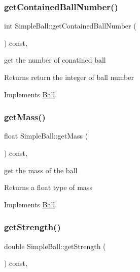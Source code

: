 \subsubsection{\texorpdfstring{get\+Contained\+Ball\+Number()}{getContainedBallNumber()}}
{\footnotesize\ttfamily int Simple\+Ball\+::get\+Contained\+Ball\+Number (\begin{DoxyParamCaption}{ }\end{DoxyParamCaption}) const\hspace{0.3cm}{\ttfamily [override]}, {\ttfamily [virtual]}}



get the number of conatined ball 

\begin{DoxyReturn}{Returns}
return the integer of ball number 
\end{DoxyReturn}


Implements \mbox{\hyperlink{class_ball_a13794c8d0e0863301a5f321a617542f6}{Ball}}.

\mbox{\label{class_simple_ball_a0cb0b931a2e3fa9f2ffba6fd354985ea}} 
\subsubsection{\texorpdfstring{get\+Mass()}{getMass()}}
{\footnotesize\ttfamily float Simple\+Ball\+::get\+Mass (\begin{DoxyParamCaption}{ }\end{DoxyParamCaption}) const\hspace{0.3cm}{\ttfamily [override]}, {\ttfamily [virtual]}}



get the mass of the ball 

\begin{DoxyReturn}{Returns}
a float type of mass 
\end{DoxyReturn}


Implements \mbox{\hyperlink{class_ball_ab755ce741a2f0b652f499d183376be04}{Ball}}.

\mbox{\label{class_simple_ball_a3a4c5bc776e3788112f02320432ba8cc}} 
\subsubsection{\texorpdfstring{get\+Strength()}{getStrength()}}
{\footnotesize\ttfamily double Simple\+Ball\+::get\+Strength (\begin{DoxyParamCaption}{ }\end{DoxyParamCaption}) const\hspace{0.3cm}{\ttfamily [override]}, {\ttfamily [virtual]}}




